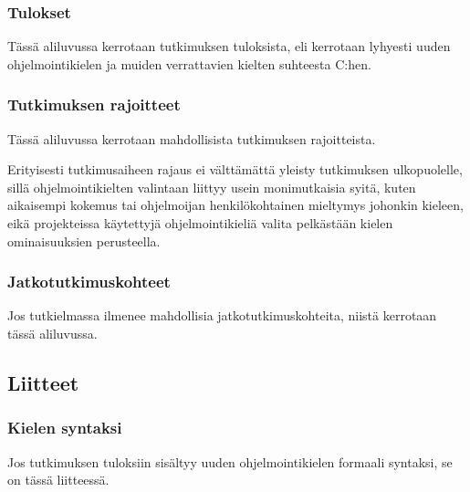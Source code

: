 \subsubsection{Tulokset}

Tässä aliluvussa kerrotaan tutkimuksen tuloksista, eli kerrotaan lyhyesti uuden
ohjelmointikielen ja muiden verrattavien kielten suhteesta C:hen.

\subsubsection{Tutkimuksen rajoitteet}

Tässä aliluvussa kerrotaan mahdollisista tutkimuksen rajoitteista.

Erityisesti tutkimusaiheen rajaus ei välttämättä yleisty tutkimuksen
ulkopuolelle, sillä ohjelmointikielten valintaan liittyy usein monimutkaisia
syitä, kuten aikaisempi kokemus tai ohjelmoijan henkilökohtainen mieltymys
johonkin kieleen, eikä projekteissa käytettyjä ohjelmointikieliä valita
pelkästään kielen ominaisuuksien perusteella.

\subsubsection{Jatkotutkimuskohteet}

Jos tutkielmassa ilmenee mahdollisia jatkotutkimuskohteita, niistä kerrotaan
tässä aliluvussa.

\renewcommand{\thesubsubsection}{Liite \arabic{subsubsection}. }

\subsection{Liitteet}

\subsubsection{Kielen syntaksi}

Jos tutkimuksen tuloksiin sisältyy uuden ohjelmointikielen formaali syntaksi,
se on tässä liitteessä.
